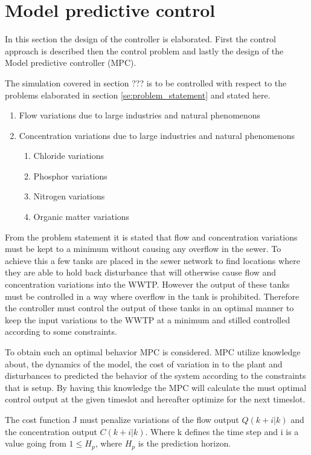 \section{Model predictive control}\label{se:model_predictive_control}
In this section the design of the controller is elaborated. First the control approach is described then the control problem and lastly the design of the Model predictive controller (MPC). 

The simulation covered in section ??? is to be controlled with respect to the problems elaborated in section \ref{se:problem_statement} and stated here. 
\begin{enumerate}
\item Flow variations due to large industries and natural phenomenons
\item Concentration variations due to large industries and natural phenomenons
\begin{enumerate}
	\item Chloride variations
	\item Phosphor variations
	\item Nitrogen variations
	\item Organic matter variations
\end{enumerate}
\end{enumerate}

From the problem statement it is stated that flow and concentration variations must be kept to a minimum without causing any overflow in the sewer. To achieve this a few tanks are placed in the sewer network to find locations where they are able to hold back disturbance that will otherwise cause flow and concentration variations into the WWTP. However the output of these tanks must be controlled in a way where overflow in the tank is prohibited. Therefore the controller must control the output of these tanks in an optimal manner to keep the input variations to the WWTP at a minimum and stilled controlled according to some constraints.

To obtain such an optimal behavior MPC is considered. MPC utilize knowledge about, the dynamics of the model, the cost of variation in to the plant and disturbances to predicted the behavior of the system according to the constraints that is setup. By having this knowledge the MPC will calculate the must optimal control output at the given timeslot and hereafter optimize for the next timeslot.        

The cost function J must penalize variations of the flow output $Q(k+i|k)$ and the concentration output $C(k+i|k)$. Where k defines the time step and i is a value going from $1\leq H_p$, where $H_p$ is the prediction horizon. 

